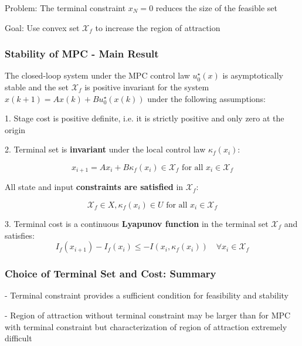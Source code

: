 Problem: The terminal constraint $x_N = 0$ reduces
the size of the feasible set

Goal: Use convex set $\mathcal{X}_f$ to increase the region of attraction


\subsubsection{Stability of MPC - Main Result}

\begin{theorem}
	The closed-loop system under the MPC control law $u_0^\star(x)$
	is asymptotically stable and the set $\mathcal{X}_f$
	is positive invariant for the system
	$x(k+1) = Ax(k) + Bu_0^\star(x(k))$
	under the following assumptions:

	1. Stage cost is positive definite, i.e. it is strictly positive and only zero at
	the origin

	2. Terminal set is \textbf{invariant}
	under the local control law $\kappa_f(x_i)$:

	\[
		x_{i+1} = Ax_i + B\kappa_f(x_i) \in \mathcal{X}_f
		\text{ for all } x_i \in \mathcal{X}_f
	\]

	All state and input \textbf{constraints are satisfied} in $\mathcal{X}_f$:

	\[
		\mathcal{X}_f \in X, \kappa_f(x_i) \in U
		\text{ for all } x_i \in \mathcal{X}_f
	\]

	3. Terminal cost is a continuous \textbf{Lyapunov function}
	in the terminal set $\mathcal{X}_f$ and satisfies:
	\[
		I_f(x_{i+1}) - I_f(x_i) \leq
		- I(x_i, \kappa_f(x_i)) \quad
		\forall x_i \in \mathcal{X}_f
	\]
\end{theorem}


\subsubsection{Choice of Terminal Set and Cost: Summary}

- Terminal constraint provides a sufficient condition
for feasibility and stability

- Region of attraction without terminal constraint may be larger than for
MPC with terminal constraint but characterization of region of attraction
extremely difficult %

